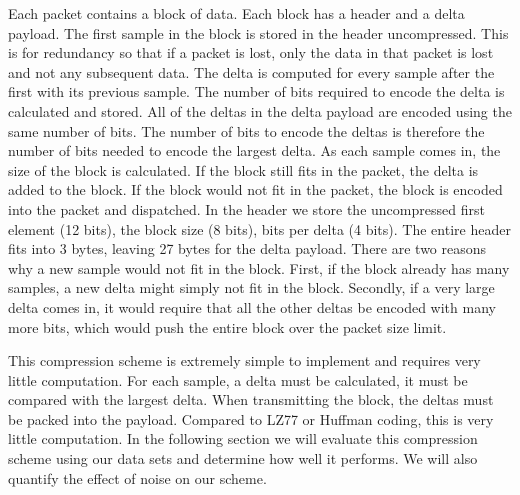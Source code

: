 Each packet contains a block of data. Each block has a header and a
delta payload. The first sample in the block is stored in the header
uncompressed. This is for redundancy so that if a packet is lost, only
the data in that packet is lost and not any subsequent data. The delta
is computed for every sample after the first with its previous
sample. The number of bits required to encode the delta is calculated
and stored. All of the deltas in the delta payload are encoded using
the same number of bits. The number of bits to encode the deltas is
therefore the number of bits needed to encode the largest delta. As
each sample comes in, the size of the block is calculated. If the
block still fits in the packet, the delta is added to the block. If
the block would not fit in the packet, the block is encoded into the
packet and dispatched. In the header we store the uncompressed first
element (12 bits), the block size (8 bits), bits per delta (4
bits). The entire header fits into 3 bytes, leaving 27 bytes for the
delta payload. There are two reasons why a new sample would not fit in
the block. First, if the block already has many samples, a new delta
might simply not fit in the block. Secondly, if a very large delta
comes in, it would require that all the other deltas be encoded with
many more bits, which would push the entire block over the packet size
limit. 

This compression scheme is extremely simple to implement and requires
very little computation. For each sample, a delta must be calculated,
it must be compared with the largest delta. When transmitting the
block, the deltas must be packed into the payload. Compared to LZ77 or
Huffman coding, this is very little computation. In the following
section we will evaluate this compression scheme using our data sets
and determine how well it performs. We will also quantify the effect
of noise on our scheme.

